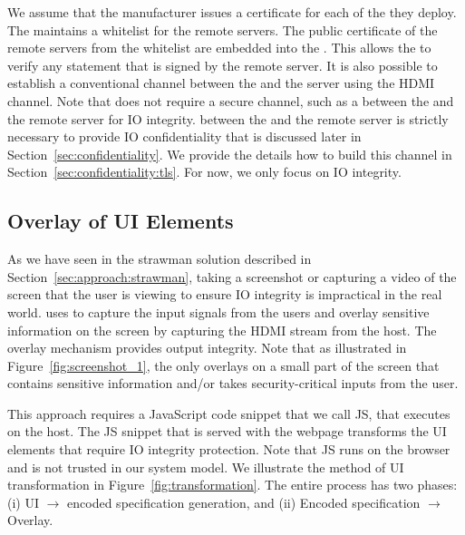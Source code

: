  We assume that the \device manufacturer issues a certificate for each of the \device they deploy. The \device maintains a whitelist for the remote servers. The public certificate of the remote servers from the whitelist are embedded into the \device. This allows the \device to verify any statement that is signed by the remote server. It is also possible to establish a conventional \tls channel between the \device and the server using the HDMI channel. Note that \name does not require a secure channel, such as a \tls between the \device and the remote server for IO integrity. \tls between the \device and the remote server is strictly necessary to provide IO confidentiality that is discussed later in Section~\ref{sec:confidentiality}. We provide the details how to build this \tls channel in Section~\ref{sec:confidentiality:tls}. For now, we only focus on IO integrity.



\subsection{\device Overlay of UI Elements}
\label{sec:systemDesign:transformation}

As we have seen in the strawman solution described in Section~\ref{sec:approach:strawman}, taking a screenshot or capturing a video of the screen that the user is viewing to ensure IO integrity is impractical in the real world. \name uses \device to capture the input signals from the users and overlay sensitive information on the screen by capturing the HDMI stream from the host. The overlay mechanism provides output integrity. Note that as illustrated in Figure~\ref{fig:screenshot_1}, the \device only overlays on a small part of the screen that contains sensitive information and/or takes security-critical inputs from the user.

 
This approach requires a JavaScript code snippet that we call \name JS, that executes on the host. The \name JS snippet that is served with the webpage transforms the UI elements that require IO integrity protection. Note that \name JS runs on the browser and is not trusted in our system model. We illustrate the method of UI transformation in Figure~\ref{fig:transformation}. The entire process has two phases: (i) UI $\rightarrow$ encoded specification generation, and (ii) Encoded specification $\rightarrow$ Overlay.    


